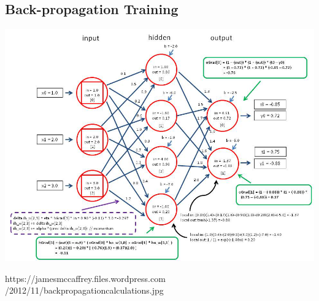 \documentclass[a0,portrait,25pt]{sciposter}
\begin{document}
\begin{multicols}{3}

\begin{mdframed}[backgroundcolor=white,roundcorner=4pt,shadow=true,linewidth=1pt]
\color{Black}
\section*{Back-propagation Training}
\begin{minipage}[c]{1\linewidth}
\includegraphics[width=0.9\linewidth]{fig01}
\end{minipage}
https://jamesmccaffrey.files.wordpress.com\\/2012/11/backpropagationcalculations.jpg
\end{mdframed}

\begin{mdframed}[backgroundcolor=white,roundcorner=4pt,shadow=true,linewidth=1pt]
\color{Black}

\end{mdframed}
\end{multicols}
\end{document}
